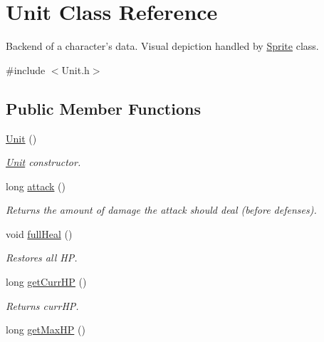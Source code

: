 \hypertarget{class_unit}{}\section{Unit Class Reference}
\label{class_unit}


Backend of a character’s data. Visual depiction handled by \hyperlink{class_sprite}{Sprite} class.  




{\ttfamily \#include $<$Unit.\+h$>$}

\subsection*{Public Member Functions}
\begin{DoxyCompactItemize}
\item 
\hyperlink{class_unit_a8e46f663a95736c8002d85ab271a7581}{Unit} ()\hypertarget{class_unit_a8e46f663a95736c8002d85ab271a7581}{}\label{class_unit_a8e46f663a95736c8002d85ab271a7581}

\begin{DoxyCompactList}\small\item\em \hyperlink{class_unit}{Unit} constructor. \end{DoxyCompactList}\item 
long \hyperlink{class_unit_a005874f369a17842d2ecb42539dacca9}{attack} ()\hypertarget{class_unit_a005874f369a17842d2ecb42539dacca9}{}\label{class_unit_a005874f369a17842d2ecb42539dacca9}

\begin{DoxyCompactList}\small\item\em Returns the amount of damage the attack should deal (before defenses). \end{DoxyCompactList}\item 
void \hyperlink{class_unit_a2a7293b325fbe8e73fece385b2a0970f}{full\+Heal} ()\hypertarget{class_unit_a2a7293b325fbe8e73fece385b2a0970f}{}\label{class_unit_a2a7293b325fbe8e73fece385b2a0970f}

\begin{DoxyCompactList}\small\item\em Restores all HP. \end{DoxyCompactList}\item 
long \hyperlink{class_unit_a111f87266234d9bd4a0d851f4d658d86}{get\+Curr\+HP} ()\hypertarget{class_unit_a111f87266234d9bd4a0d851f4d658d86}{}\label{class_unit_a111f87266234d9bd4a0d851f4d658d86}

\begin{DoxyCompactList}\small\item\em Returns curr\+HP. \end{DoxyCompactList}\item 
long \hyperlink{class_unit_a9aa287c4ed593378b03643b64c8481e5}{get\+Max\+HP} ()\hypertarget{class_unit_a9aa287c4ed593378b03643b64c8481e5}{}\label{class_unit_a9aa287c4ed593378b03643b64c8481e5}


\end{DoxyCompactItemize}
